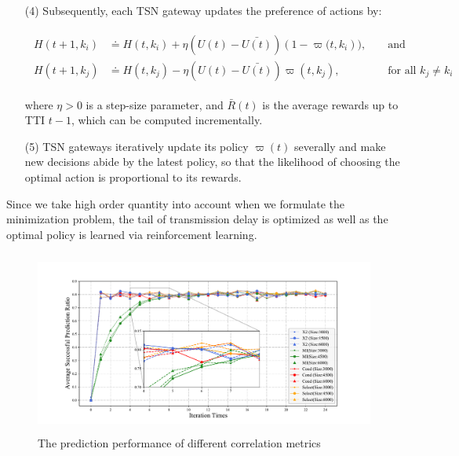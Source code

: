 \documentclass{SCIS2021}
\begin{document}
	\begin{itemize}[itemsep=15 pt,topsep = -1.5 pt]
		\item[(4)]
		Subsequently, each TSN gateway updates the  preference of actions by:\\
		\setlength\abovedisplayskip{-30pt}
		\begin{center}
			\begin{equation}
				\begin{aligned}
					\begin{aligned} 
						H\left(t+1,k_{i}\right) & \doteq H(t,k_{i})+\eta\left(U(t)-\bar{U(t)}\right)\left(1-\varpi(t,k_{i}\right)), & & \text { and } \\ H(t+1,k_{j}) & \doteq H(t,k_{j})-\eta\left(U(t)-\bar{{U}(t)}\right) \varpi(t,k_{j}), & & \text { for all } k_{j} \neq k_{i} \end{aligned}
				\end{aligned}
			\end{equation}
		\end{center}
		\setlength\belowdisplayskip{-10pt}
		\vspace{-6pt}
		where $\eta>0$ is a step-size parameter, and $\bar{R}(t)$ is the average rewards up to TTI $t-1$, which can be computed incrementally\cite{sutton2018reinforcement}.
	\end{itemize}
	
	\begin{itemize}[itemsep= 15pt,topsep = -1 pt]
		\item[(5)]
		TSN gateways iteratively update its policy $\varpi(t)$ severally and make new decisions abide by the latest policy, so that the likelihood of choosing the optimal action is proportional to its rewards.
	\end{itemize}
	
	\par Since we take high order quantity into account when we formulate the minimization problem, the tail of transmission delay is optimized as well as the optimal policy is learned via reinforcement learning.
	

	\begin{figure}[b]
		\centering 
		\includegraphics[height=6cm, width=11.5cm]{pre_accu} 
		\caption{The prediction performance of different correlation metrics} 
		\label{pic:prediction precision}
	\end{figure}
\end{document}
